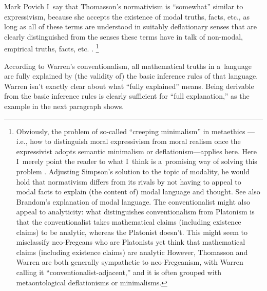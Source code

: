\begin{artengenv}{Mark Povich}
I~say that Thomasson's normativism is ``somewhat'' similar to expressivism, because she accepts the existence of modal truths, facts, etc., as long as all of these terms are understood in suitably deflationary senses that are clearly distinguished from the senses these terms have in talk of non-modal, empirical truths, facts, etc.
\parencites[][]{thomasson_norms_2020}[see also][]{baker_mathematical_2009}.%
\footnote{Obviously, the problem of so-called ``creeping minimalism'' in metaethics 
\parencite[][]{dreier_metaethics_2004}%
---i.e., how to distinguish moral expressivism from moral realism once the expressivist adopts semantic minimalism or deflationism---applies here. Here I~merely point the reader to what I~think is a~promising way of solving this problem 
\parencite[][]{simpson_creeping_2020}. %
 Adjusting Simpson's solution to the topic of modality, he would hold that normativism differs from its rivals by not having to appeal to modal facts to explain (the content of) modal language and thought. See also Brandom's 
\parencite*[][]{mancosu_mathematical_2008} %
 explanation of modal language. The conventionalist might also appeal to analyticity: what distinguishes conventionalism from Platonism is that the conventionalist takes mathematical claims (including existence claims) to be analytic, whereas the Platonist doesn't. This might seem to misclassify neo-Fregeans who are Platonists yet think that mathematical claims (including existence claims) are analytic 
 However, Thomasson 
\parencite*[][]{thomasson_ontology_2014} %
 and Warren 
\parencite*[][]{warren_shadows_2020} %
 are both generally sympathetic to neo-Fregeanism, with Warren 
\parencite*[][pp.198, 203]{warren_shadows_2020} %
 calling it ``conventionalist-adjacent,'' and it is often grouped with metaontological deflationisms or minimalisms.}

According to Warren's
\parencite*[][]{simpson_creeping_2020} %
 conventionalism, all mathematical truths in a~language are fully explained by (the validity of) the basic inference rules of that language. Warren isn't exactly clear about what ``fully explained'' means. Being derivable from the basic inference rules is clearly sufficient for ``full explanation,'' as the example in the next paragraph shows.


\end{artengenv}
